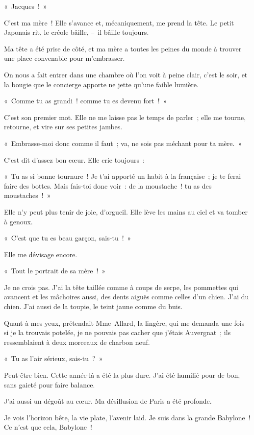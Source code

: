 \documentclass[french,twoside]{book} %
\begin{document}
\noindent « Jacques ! »\par
C’est ma mère ! Elle s’avance et, mécaniquement, me prend la tête. Le petit Japonais rit, le créole bâille, – il bâille toujours.\par
Ma tête a été prise de côté, et ma mère a toutes les peines du monde à trouver une place convenable pour m’embrasser.\par
\bigbreak
\noindent On nous a fait entrer dans une chambre où l’on voit à peine clair, c’est le soir, et la bougie que le concierge apporte ne jette qu’une faible lumière.\par
« Comme tu as grandi ! comme tu es devenu fort ! »\par
C’est son premier mot. Elle ne me laisse pas le temps de parler ; elle me tourne, retourne, et vire sur ses petites jambes.\par
« Embrasse-moi donc comme il faut ; va, ne sois pas méchant pour ta mère. »\par
C’est dit d’assez bon cœur. Elle crie toujours :\par
« Tu as si bonne tournure ! Je t’ai apporté un habit à la française ; je te ferai faire des bottes. Mais fais-toi donc voir : de la moustache ! tu as des moustaches ! »\par
Elle n’y peut plus tenir de joie, d’orgueil. Elle lève les mains au ciel et va tomber à genoux.\par
« C’est que tu es beau garçon, sais-tu ! »\par
Elle me dévisage encore.\par
« Tout le portrait de sa mère ! »\par
Je ne crois pas. J’ai la tête taillée comme à coups de serpe, les pommettes qui avancent et les mâchoires aussi, des dents aiguës comme celles d’un chien. J’ai du chien. J’ai aussi de la toupie, le teint jaune comme du buis.\par
Quant à mes yeux, prétendait Mme Allard, la lingère, qui me demanda une fois si je la trouvais potelée, je ne pouvais pas cacher que j’étais Auvergnat ; ils ressemblaient à deux morceaux de charbon neuf.\par
« Tu as l’air sérieux, sais-tu ? »\par
Peut-être bien. Cette année-là a été la plus dure. J’ai été humilié pour de bon, sans gaieté pour faire balance.\par
J’ai aussi un dégoût au cœur. Ma désillusion de Paris a été profonde.\par
Je vois l’horizon bête, la vie plate, l’avenir laid. Je suis dans la grande Babylone ! Ce n’est que cela, Babylone !\par
\end{document}
